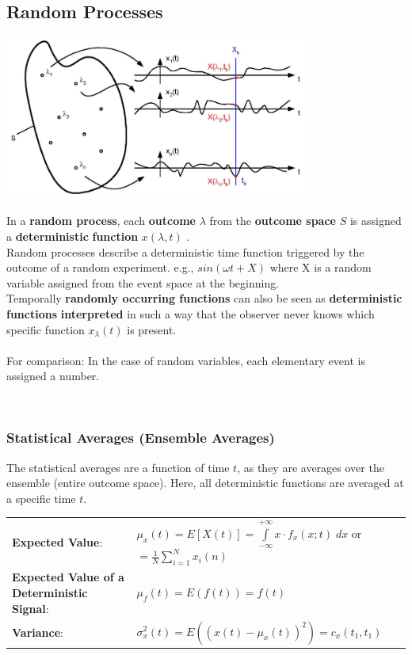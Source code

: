		\subsection{Random Processes}
		\begin{minipage}{10.3cm}
			\includegraphics[width=10cm]{bilder/zufallsprozess.png}
		\end{minipage}
		\begin{minipage}{8.5cm}
			In a \textbf{random process}, each \textbf{outcome} \boldmath$\lambda$ from
			the \textbf{outcome space} $S$ is assigned a \textbf{deterministic} \textbf{function} $x(\lambda, t)$
			\unboldmath. \\
			Random processes describe a deterministic time function triggered by the outcome of
			a random experiment. e.g., $sin(\omega t + X)$ where X is a random variable assigned from the event space at the beginning.\\
			Temporally \textbf{randomly occurring functions} can also be seen as \textbf{deterministic functions}
			\textbf{interpreted} in such a way that the observer never knows which specific function $x_\lambda(t)$
			is present.  \\ \\
			For comparison: In the case of random variables, each elementary event is assigned a number.
		\end{minipage}
		\vspace{0.5cm} \\

		\subsubsection{Statistical Averages (Ensemble Averages)}
		The statistical averages are a function of time $t$, as they are averages over the
		ensemble (entire outcome space). Here, all deterministic functions are averaged at a
		specific time $t$.

		\renewcommand{\arraystretch}{1.4}
		\begin{tabular}[c]{ p{4.5cm}  p{13.5 cm}  }
			\textbf{Expected Value}:   &  $\mu_{x}(t) = E\left[X(t)\right] =
				  \int\limits_{-\infty}^{+\infty} x \cdot f_{x}(x;t)\;dx$ or $=\frac{1}{N}\sum\limits_{i=1}^{N}x_i(n)$ \\
			\textbf{Expected Value of a Deterministic Signal}:& $\mu_f(t) = E(f(t))=f(t)$\\
			\textbf{Variance}: &         $\sigma_x^2(t)=E((x(t)-\mu_x(t))^2)=c_x(t_1,t_1)$
		\end{tabular}
		\renewcommand{\arraystretch}{1}



